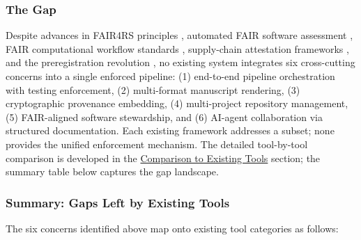 \documentclass[
]{article}
\newcounter{none} %
\begin{document}
\subsubsection{The Gap}\label{the-gap}

Despite advances in FAIR4RS principles
\citep{barker2022fair4rs, lamprecht2020towards}, automated FAIR software
assessment \citep{garijo2024fairsoft}, FAIR computational workflow
standards \citep{goble2020fair}, supply-chain attestation frameworks
\citep{torresarias2019intoto, openssf2023slsa}, and the preregistration
revolution \citep{nosek2018preregistration}, no existing system
integrates six cross-cutting concerns into a single enforced pipeline:
(1) end-to-end pipeline orchestration with testing enforcement, (2)
multi-format manuscript rendering, (3) cryptographic provenance
embedding, (4) multi-project repository management, (5) FAIR-aligned
software stewardship, and (6) AI-agent collaboration via structured
documentation. Each existing framework addresses a subset; none provides
the unified enforcement mechanism. The detailed tool-by-tool comparison
is developed in the
\href{05c_comparison.md\#comparison-to-existing-tools}{Comparison to
Existing Tools} section; the summary table below captures the gap
landscape.

\subsubsection{Summary: Gaps Left by Existing
Tools}\label{summary-gaps-left-by-existing-tools}

The six concerns identified above map onto existing tool categories as
follows:
\end{document}
